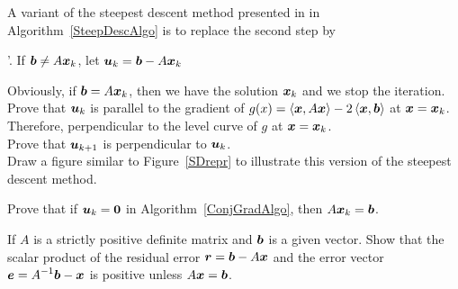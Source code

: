 \begin{question}
A variant of the steepest descent method presented in 
in Algorithm~\ref{SteepDescAlgo} is to replace the second step
by

'. If $\bm{b} \neq A\bm{x}_k$, let
$\bm{u}_k = \bm{b} - A\bm{x}_k$

Obviously, if $\bm{b} = A\bm{x}_k$, then we have the solution
$\bm{x}_k$ and we stop the iteration.\\
 Prove that $\bm{u}_k$ is parallel to the gradient of
$g(x) = \left\langle{\bm{x}} , {A\bm{x}}\right\rangle - 2 \left\langle{\bm{x}} , {\bm{b}}\right\rangle$ at $\bm{x}
= \bm{x}_k$.  Therefore, perpendicular to the level curve of $g$ at
$\bm{x} = \bm{x}_k$.\\
 Prove that $\bm{u}_{k+1}$ is perpendicular to $\bm{u}_k$.\\
 Draw a figure similar to Figure~\ref{SDrepr} to illustrate
this version of the steepest descent method.
\label{solvBQ15}
\end{question}


\begin{question}
Prove that if $\bm{u}_k=\bm{0}$ in Algorithm~\ref{ConjGradAlgo},
then $A\bm{x}_k = \bm{b}$.
\end{question}

\begin{question}
If $A$ is a strictly positive definite matrix and $\bm{b}$ is a given
vector.  Show that the scalar product of the residual error
$\bm{r} = \bm{b} - A \bm{x}$ and the error vector
$\displaystyle \bm{e} = A^{-1}\bm{b} - \bm{x}$ is positive unless
$A\bm{x} = \bm{b}$.
\end{question}


